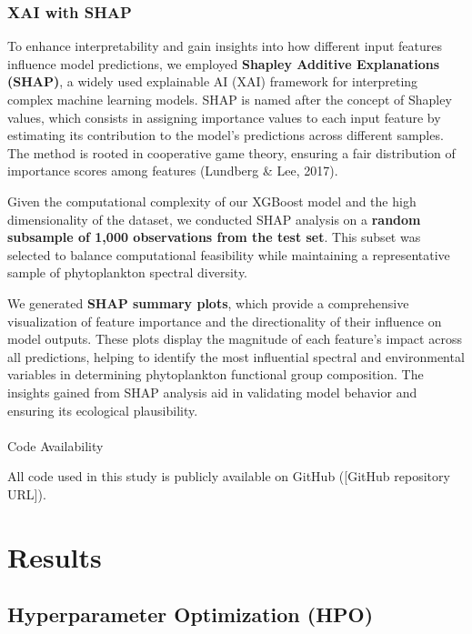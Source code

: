 \documentclass[
]{agujournal2019}
\makeatletter
\let\oldparagraph\paragraph
\renewcommand{\paragraph}{
    \@ifstar
      \xxxParagraphStar
      \xxxParagraphNoStar
  }
\newcommand{\xxxParagraphStar}[1]{\oldparagraph*{#1}\mbox{}}
\newcommand{\xxxParagraphNoStar}[1]{\oldparagraph{#1}\mbox{}}
\makeatother
\begin{document}
\subsubsection{XAI with SHAP}\label{xai-with-shap}

To enhance interpretability and gain insights into how different input
features influence model predictions, we employed \textbf{Shapley
Additive Explanations (SHAP)}, a widely used explainable AI (XAI)
framework for interpreting complex machine learning models. SHAP is
named after the concept of Shapley values, which consists in assigning
importance values to each input feature by estimating its contribution
to the model's predictions across different samples. The method is
rooted in cooperative game theory, ensuring a fair distribution of
importance scores among features (Lundberg \& Lee, 2017).

Given the computational complexity of our XGBoost model and the high
dimensionality of the dataset, we conducted SHAP analysis on a
\textbf{random subsample of 1,000 observations from the test set}. This
subset was selected to balance computational feasibility while
maintaining a representative sample of phytoplankton spectral diversity.

We generated \textbf{SHAP summary plots}, which provide a comprehensive
visualization of feature importance and the directionality of their
influence on model outputs. These plots display the magnitude of each
feature's impact across all predictions, helping to identify the most
influential spectral and environmental variables in determining
phytoplankton functional group composition. The insights gained from
SHAP analysis aid in validating model behavior and ensuring its
ecological plausibility.

\paragraph{Code Availability}\label{code-availability}

All code used in this study is publicly available on GitHub ({[}GitHub
repository URL{]}).

\section{Results}\label{results}

\subsection{Hyperparameter Optimization
(HPO)}\label{hyperparameter-optimization-hpo}
\end{document}
